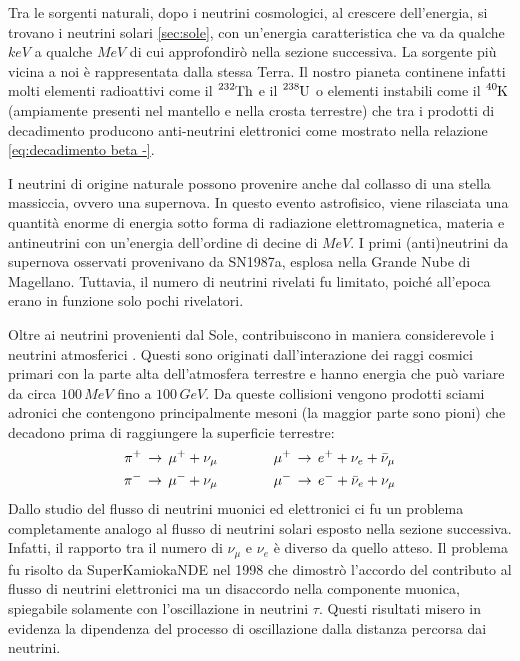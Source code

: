  
 Tra le sorgenti naturali, dopo i neutrini cosmologici, al crescere dell'energia, si trovano i neutrini solari \ref{sec:sole}, con un'energia caratteristica che va da qualche $\unit{keV}$ a qualche $\unit{MeV}$ di cui approfondirò nella sezione successiva. La sorgente più vicina a noi è rappresentata dalla stessa Terra. Il nostro pianeta continene infatti molti elementi radioattivi come il $\ce{^{232}Th}$ e il $\ce{^{238}U}$ o elementi instabili come il $\ce{^{40}K}$ (ampiamente presenti nel mantello e nella crosta terrestre) che tra i prodotti di decadimento producono anti-neutrini elettronici come mostrato nella relazione \ref{eq:decadimento beta -}. 

I neutrini di origine naturale possono provenire anche dal collasso di una stella massiccia, ovvero una supernova. In questo evento astrofisico, viene rilasciata una quantità enorme di energia sotto forma di radiazione elettromagnetica, materia e antineutrini con un'energia dell'ordine di decine di $\unit{MeV}$. I primi (anti)neutrini da supernova osservati provenivano da SN1987a, esplosa nella Grande Nube di Magellano. Tuttavia, il numero di neutrini rivelati fu limitato, poiché all'epoca erano in funzione solo pochi rivelatori.
 
 Oltre ai neutrini provenienti dal Sole, contribuiscono in maniera considerevole i neutrini atmosferici \cite{alma991017639394506032}. Questi sono originati dall'interazione dei raggi cosmici primari con la parte alta dell'atmosfera terrestre e hanno energia che può variare da circa $100\,\unit{MeV}$ fino a $100\,\unit{GeV}$. Da queste collisioni vengono prodotti sciami adronici che contengono principalmente mesoni (la maggior parte sono pioni) che decadono prima di raggiungere la superficie terrestre:
 \begin{equation}\label{eq:sciami}
\begin{gathered}
\pi^+\,\rightarrow\,\mu^++\nu_\mu \qquad\qquad  \mu^+\,\rightarrow \, e^++\nu_e+\Bar{\nu}_\mu\\
\pi^-\,\rightarrow\,\mu^-+\nu_\mu \qquad\qquad \mu^-\,\rightarrow \, e^-+\Bar{\nu}_e+\nu_\mu
\end{gathered}
\end{equation}
Dallo studio del flusso di neutrini muonici ed elettronici ci fu un problema completamente analogo al flusso di neutrini solari esposto nella sezione successiva. Infatti, il rapporto tra il numero di $\nu_\mu$ e $\nu_e$ è diverso da quello atteso. Il problema fu risolto da SuperKamiokaNDE \cite{Super-Kamiokande:1998kpq} nel 1998 che dimostrò l'accordo del contributo al flusso di neutrini elettronici ma un disaccordo nella componente muonica, spiegabile solamente con l'oscillazione in neutrini $\tau$. Questi risultati misero in evidenza la dipendenza del processo di oscillazione dalla distanza percorsa dai neutrini. 


